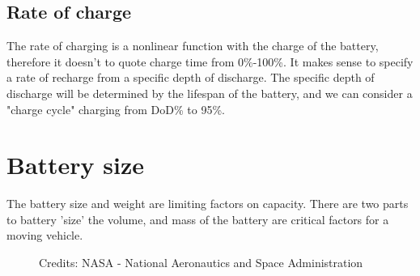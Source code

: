 \documentclass{article}
\begin{document}
\subsection{Rate of charge}
The rate of charging is a nonlinear function with the charge of the battery, therefore it doesn't to quote charge time from 0\%-100\%.
It makes sense to specify a rate of recharge from a specific depth of discharge.
The specific depth of discharge will be determined by the lifespan of the battery, and we can consider a "charge cycle" charging from DoD\% to 95\%.

\section{Battery size}
The battery size and weight are limiting factors on capacity.
There are two parts to battery 'size' the volume, and mass of the battery are critical factors for a moving vehicle.
\begin{figure}[H]
    \centering
    \caption{Credits: NASA - National Aeronautics and Space Administration}
    \label{fig:route}
\end{figure}
\end{document}
